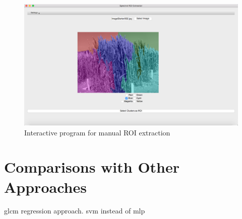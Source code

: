 \begin{figure}[ht!]
\centering
\includegraphics[scale=0.75]{Images/gui}
\caption{Interactive program for manual ROI extraction}
\label{fig1}
\end{figure}

\bigskip

\goodbreak

\section{Comparisons with Other Approaches}
glcm regression approach. svm instead of mlp


\bigskip




